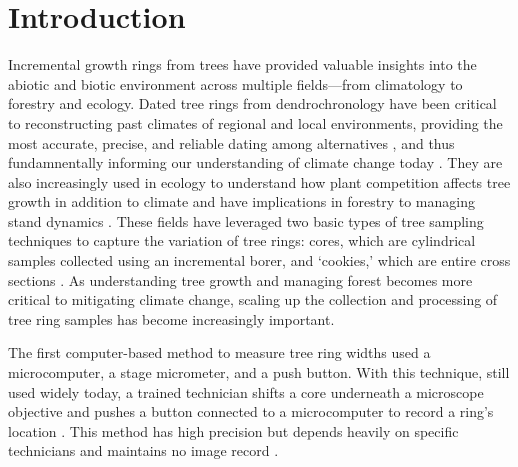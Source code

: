 \documentclass[a4paper,12pt]{article}
\begin{document}
\section{Introduction} %
Incremental growth rings from trees have provided valuable insights into the abiotic and biotic environment across multiple fields---from climatology to forestry and ecology. Dated tree rings from dendrochronology have been critical to
reconstructing past climates of regional and local environments, providing the most accurate, precise, and reliable dating among alternatives \citep{mann_northern_1999}, and thus fundamnentally informing  our understanding of climate change today \citep{fritts_dendroclimatology_1971} \citep{williams_using_2010} \citep{guibal_dendrochronology_2021} \citep{sheppard_dendroclimatology_2010}. They are also increasingly used in ecology to understand how plant competition affects tree growth in addition to climate \citep{buechling_climate_2017} and have implications in forestry to managing stand dynamics \citep{canham_neighborhood_2004}. These fields have leveraged two basic types of tree sampling techniques to capture the variation of tree rings: cores, which are cylindrical samples collected using an incremental borer, and `cookies,' which are entire cross sections \citep[and thus allow measuring as many radii from the sample as desired,][]{speer_fundamentals_2010}. As understanding tree growth and managing forest becomes more critical to mitigating climate change, scaling up the collection and processing of tree ring samples has become increasingly important. 

The first computer-based method to measure tree ring widths used a microcomputer, a stage micrometer, and a push button. With this technique, still used widely today, a trained technician shifts a core underneath a microscope objective and pushes a button connected to a microcomputer to record a ring's location \citep{robinson_microcomputer_1980}. %
This method has high precision but depends heavily on specific technicians and maintains no image record \citep{levanic_atrics_2007}. 
\end{document}
